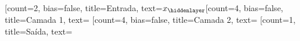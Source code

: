 \documentclass{standalone}
\begin{document}
\begin{neuralnetwork}[height=4]
		\newcommand{\nodetextx}[2]{$x_{#2}$}
		\newcommand{\nodenone}[2]{} 
		[count=2, bias=false, title=Entrada, text=\nodetextx]  
		\hiddenlayer[count=4, bias=false, title=Camada 1, text=\nodenone] \linklayers 
		\hiddenlayer[count=4, bias=false, title=Camada 2, text=\nodenone] \linklayers 
		\outputlayer[count=1, title=Saída, text=\nodenone] \linklayers 
\end{neuralnetwork}
\end{document}
